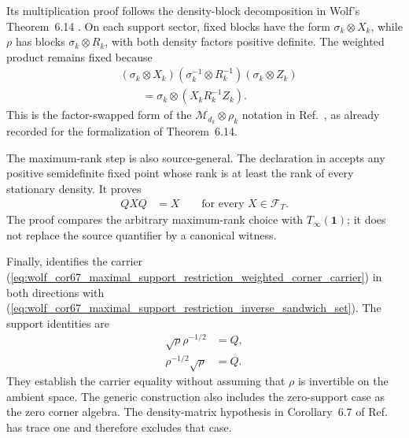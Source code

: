 \documentclass[11pt]{article}
\begin{document}
Its multiplication proof follows the density-block decomposition in
Wolf's Theorem~6.14 \cite{Wolf2012Quantum}. On each support sector, fixed
blocks have the form $\sigma_k\otimes X_k$, while $\rho$ has blocks
$\sigma_k\otimes R_k$, with both density factors positive definite. The
weighted product remains fixed because
\begin{align}
    &(\sigma_k\otimes X_k)
      (\sigma_k^{-1}\otimes R_k^{-1})
      (\sigma_k\otimes Z_k)\nonumber\\
        &\qquad
        =\sigma_k\otimes(X_kR_k^{-1}Z_k).
    \label{eq:wolf_cor67_maximal_support_restriction_weighted_block_product}
\end{align}
This is the factor-swapped form of the
$\mathcal M_{d_k}\otimes\rho_k$ notation in
Ref.~\cite{Wolf2012Quantum}, as already recorded for the formalization of
Theorem~6.14.

The maximum-rank step is also source-general. The declaration
 in
 accepts any
positive semidefinite fixed point whose rank is at least the rank of every
stationary density. It proves
\begin{align}
    QXQ
        &=X
        \qquad\text{for every }X\in\mathcal F_T.
    \label{eq:wolf_cor67_maximal_support_restriction_maximal_support_identity}
\end{align}
The proof compares the arbitrary maximum-rank choice with
$T_\infty(\mathbf 1)$; it does not replace the source quantifier by a
canonical witness.

Finally,
identifies the carrier
(\ref{eq:wolf_cor67_maximal_support_restriction_weighted_corner_carrier}) in
both directions with
(\ref{eq:wolf_cor67_maximal_support_restriction_inverse_sandwich_set}). The
support identities are
\begin{align}
    \sqrt{\rho} \rho^{-1/2}
        &=Q,
    \label{eq:wolf_cor67_maximal_support_restriction_left_support_identity}\\
    \rho^{-1/2}\sqrt{\rho}
        &=Q.
    \label{eq:wolf_cor67_maximal_support_restriction_right_support_identity}
\end{align}
They establish the carrier equality without assuming that $\rho$ is
invertible on the ambient space. The generic construction also includes the
zero-support case as the zero corner algebra. The density-matrix hypothesis
in Corollary~6.7 of Ref.~\cite{Wolf2012Quantum} has trace one and therefore
excludes that case.
\end{document}

